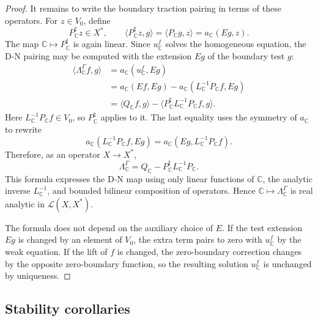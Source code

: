 \documentclass[12pt,oneside]{amsart}
\newcommand{\cL}{\mathcal L}
\newcommand{\dual}[2]{\langle #1,#2\rangle}
\begin{document}
\begin{proof}
It remains to write the boundary traction pairing in terms of these operators.  For $z\in V_0$, define
\[
        P_{\mathbb C}^{\sharp}z\in X^*,
        \qquad
        \dual{P_{\mathbb C}^{\sharp}z}{g}
        =\dual{P_{\mathbb C}g}{z}
        =a_{\mathbb C}(Eg,z).
\]
The map $\mathbb C\mapsto P_{\mathbb C}^{\sharp}$ is again linear.  Since $u_{\mathbb C}^f$ solves the homogeneous equation, the D-N pairing may be computed with the extension $Eg$ of the boundary test $g$:
\[
\begin{aligned}
        \dual{\Lambda_{\mathbb C}^\Gamma f}{g}
        &=a_{\mathbb C}(u_{\mathbb C}^f,Eg) \\
        &=a_{\mathbb C}(Ef,Eg)
          -a_{\mathbb C}(L_{\mathbb C}^{-1}P_{\mathbb C}f,Eg) \\
        &=\dual{Q_{\mathbb C}f}{g}
          -\dual{P_{\mathbb C}^{\sharp}L_{\mathbb C}^{-1}P_{\mathbb C}f}{g}.
\end{aligned}
\]
Here $L_{\mathbb C}^{-1}P_{\mathbb C}f\in V_0$, so $P_{\mathbb C}^{\sharp}$ applies to it.  The last equality uses the symmetry of $a_{\mathbb C}$ to rewrite
\[
        a_{\mathbb C}(L_{\mathbb C}^{-1}P_{\mathbb C}f,Eg)
        =a_{\mathbb C}(Eg,L_{\mathbb C}^{-1}P_{\mathbb C}f).
\]
Therefore, as an operator $X\to X^*$,
\[
        \Lambda_{\mathbb C}^\Gamma
        =Q_{\mathbb C}
        -P_{\mathbb C}^{\sharp}L_{\mathbb C}^{-1}P_{\mathbb C}.
\]
This formula expresses the D-N map using only linear functions of $\mathbb C$, the analytic inverse $L_{\mathbb C}^{-1}$, and bounded bilinear composition of operators.  Hence $\mathbb C\mapsto\Lambda_{\mathbb C}^\Gamma$ is real analytic in $\cL(X,X^*)$.

The formula does not depend on the auxiliary choice of $E$.  If the test extension $Eg$ is changed by an element of $V_0$, the extra term pairs to zero with $u_{\mathbb C}^f$ by the weak equation.  If the lift of $f$ is changed, the zero-boundary correction changes by the opposite zero-boundary function, so the resulting solution $u_{\mathbb C}^f$ is unchanged by uniqueness.
\end{proof}

\subsection{Stability corollaries}
\end{document}
